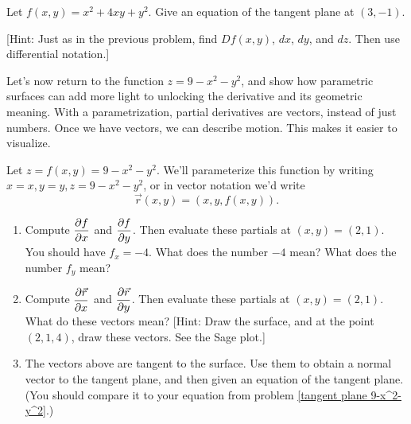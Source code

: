 \begin{problem}%
%
 Let $f(x,y)=x^2+4xy+y^2$. Give an equation of the tangent plane at $(3,-1)$. 

 [Hint: Just as in the previous problem, find $Df(x,y)$, $dx$, $dy$, and $dz$.  Then use differential notation.]
\end{problem}

Let's now return to the function $z=9-x^2-y^2$, and show how parametric surfaces can add more light to unlocking the derivative and its geometric meaning. With a parametrization, partial derivatives are vectors, instead of just numbers.  Once we have vectors, we can describe motion. This makes it easier to visualize.

\begin{problem}%
%
 Let $z=f(x,y)=9-x^2-y^2$. We'll parameterize this function by writing $x=x, y=y, z=9-x^2-y^2$, or in vector notation we'd write $$\vec r(x,y) = (x,y,f(x,y)).$$ 
\begin{enumerate}
 \item Compute $\displaystyle \frac{\partial f}{\partial x}$ and $\displaystyle \frac{\partial f}{\partial y}$. Then evaluate these partials at $(x,y)=(2,1)$. You should have $f_x=-4$. What does the number $-4$ mean? What does the number $f_y$ mean? 
 \item Compute $\displaystyle \frac{\partial \vec r}{\partial x}$ and $\displaystyle \frac{\partial \vec r}{\partial y}$. Then evaluate these partials at $(x,y)=(2,1)$.  What do these vectors mean? [Hint: Draw the surface, and at the point $(2,1,4)$, draw these vectors. See the Sage plot.]
 \item The vectors above are tangent to the surface. Use them to obtain a normal vector to the tangent plane, and then given an equation of the tangent plane. (You should compare it to your equation from problem \ref{tangent plane 9-x^2-y^2}.)
\end{enumerate}
\end{problem}


